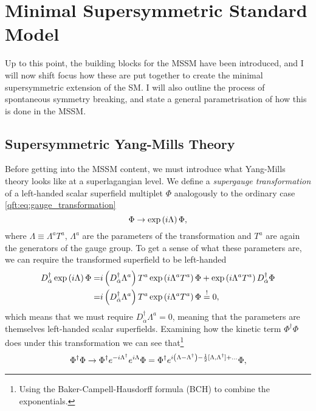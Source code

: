 \documentclass[../main.tex]{subfiles}
\begin{document}
\section{Minimal Supersymmetric Standard Model}
Up to this point, the building blocks for the MSSM have been introduced, and I will now shift focus how these are put together to create the minimal supersymmetric extension of the SM\@.
I will also outline the process of spontaneous symmetry breaking, and state a general parametrisation of how this is done in the MSSM\@.

\subsection{Supersymmetric Yang-Mills Theory}
\label{susy:ssec:susy_yang_mills}
Before getting into the MSSM content, we must introduce what Yang-Mills theory
looks like at a superlagangian level. We define a \emph{supergauge
  transformation} of a left-handed scalar superfield multiplet \(\Phi\)
analogously to the ordinary case \cref{qft:eq:gauge_transformation}
\begin{equation}
  \label{susy:eq:supergauge_transformation}
  \Phi \to \operatorname{exp}\left(i \Lambda\right) \Phi,
\end{equation}
where \(\Lambda \equiv \Lambda^a T^a\), \(\Lambda^a\) are the parameters of the transformation and \(T^a\) are again the generators of the gauge group.
To get a sense of what these parameters are, we can require the transformed superfield to be left-handed
\begin{align*}
  D_{\dot{\alpha}}^\dagger \operatorname{exp}\left(i\Lambda\right) \Phi = & i\left(D_{\dot{\alpha}}^\dagger \Lambda^a\right) T^a \operatorname{exp}\left(i\Lambda^a T^a\right) \Phi + \operatorname{exp}\left(i\Lambda^a T^a\right) D_{\dot{\alpha}}^\dagger \Phi \\
  =                                                  & i\left(D_{\dot{\alpha}}^\dagger \Lambda^a\right) T^a \operatorname{exp}\left(i\Lambda^a T^a\right) \Phi \overset{!}{=} 0,
\end{align*}
which means that we must require \(D_{\dot{\alpha}}^\dagger \Lambda^a = 0\), meaning that the parameters are themselves left-handed scalar superfields.
Examining how the kinetic term \(\Phi^\dagger \Phi\) does under this transformation we can see that\footnote{Using the Baker-Campell-Hausdorff formula (BCH) to combine the exponentials.}
\begin{equation}
  \Phi^\dagger \Phi \to \Phi^\dagger e^{-i\Lambda^\dagger} e^{i\Lambda} \Phi = \Phi^\dagger e^{i\left(\Lambda - \Lambda^\dagger\right) - \frac{1}{2} [\Lambda,\Lambda^\dagger] + \ldots} \Phi,
\end{equation}
\end{document}

